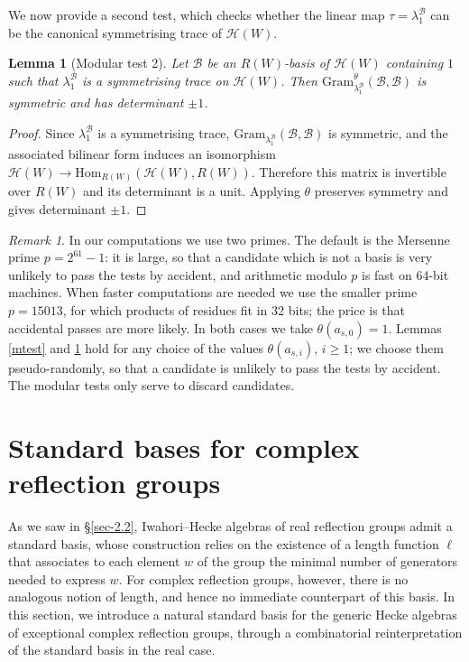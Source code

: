 \documentclass[11pt, reqno]{amsart}
\newcommand{\gram}{\mathrm{Gram}}
\newcommand{\cB}{\mathcal{B}}
\newcommand{\cH}{\mathcal{H}}
\newcommand{\Hom}{\mathrm{Hom}}
\numberwithin{equation}{section}
\newtheorem{lemma}[theorem]{Lemma}
\theoremstyle{remark}
\newtheorem{remark}[theorem]{Remark}
\begin{document}
	We now provide a second test, which checks whether the linear map $\tau=\lambda^{\cB}_1$ can be
	the canonical symmetrising trace of $\cH(W)$.
	
	\begin{lemma}[Modular test 2]\label{mtest2}
		Let $\cB$ be an $R(W)$-basis of $\cH(W)$ containing $1$ such that $\lambda^{\cB}_1$
		is a symmetrising trace on $\cH(W)$. Then
		$\gram^{\theta}_{\lambda^{\cB}_1}(\cB,\cB)$ is symmetric and has determinant $\pm1$.
	\end{lemma}
	\begin{proof}
		Since $\lambda^{\cB}_1$ is a symmetrising trace, $\gram_{\lambda^{\cB}_1}(\cB,\cB)$
		is symmetric, and the associated bilinear form induces an isomorphism
		$\cH(W)\to\Hom_{R(W)}(\cH(W),R(W))$. Therefore this matrix is invertible over
		$R(W)$ and its determinant is a unit. Applying $\theta$ preserves symmetry and
		gives determinant $\pm1$.
	\end{proof}
	
	\begin{remark}
		In our computations we use two primes. The default is the Mersenne prime
		$p=2^{61}-1$: it is large, so that a candidate which is not a basis is very
		unlikely to pass the tests by accident, and arithmetic modulo $p$ is fast on
		64-bit machines. When faster computations are needed we use the smaller prime
		$p=15013$, for which products of residues fit in 32 bits; the price is that
		accidental passes are more likely. In both cases we take $\theta(a_{s,0})=1$.
		Lemmas \ref{mtest} and \ref{mtest2} hold for
		any choice of the values $\theta(a_{s,i})$, $i\ge1$; we choose them 
		pseudo-randomly, so that a candidate is unlikely
		to pass the tests by accident. The modular tests only serve to
		discard candidates.	\end{remark}
	
	\section{Standard bases for complex reflection groups}\label{standard}
	
	As we saw in  \S \ref{sec-2.2}, Iwahori--Hecke algebras of real reflection groups admit a standard basis, whose construction relies on the existence of a length function $\ell$ that associates to each element $w$ of the group the minimal number of generators needed to express $w$. For complex reflection groups, however, there is no analogous notion of length, and hence no immediate counterpart of this basis. In this section, we introduce a natural standard basis for the generic Hecke algebras of exceptional complex reflection groups, through 
	a combinatorial reinterpretation of the standard basis in the real case. 
		
\end{document}
